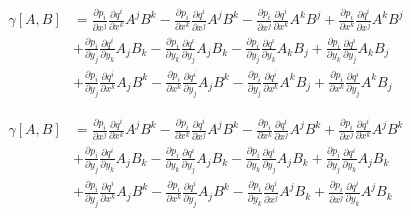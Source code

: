 \documentclass[a4paper,10pt]{article}
\numberwithin{equation}{section}
\begin{document}
\begin{align}
 \gamma[A,B] &= \frac{\partial p_i}{\partial x^j}\frac{\partial q^i}{\partial x^k}A^jB^k 
 - \frac{\partial p_i}{\partial x^k}\frac{\partial q^i}{\partial x^j}A^jB^k
 - \frac{\partial p_i}{\partial x^j}\frac{\partial q^i}{\partial x^k}A^kB^j 
 + \frac{\partial p_i}{\partial x^k}\frac{\partial q^i}{\partial x^j}A^kB^j\\
 &+ \frac{\partial p_i}{\partial y_j}\frac{\partial q^i}{\partial y_k}A_jB_k 
 - \frac{\partial p_i}{\partial y_k}\frac{\partial q^i}{\partial y_j}A_jB_k
 - \frac{\partial p_i}{\partial y_j}\frac{\partial q^i}{\partial y_k}A_kB_j 
 + \frac{\partial p_i}{\partial y_k}\frac{\partial q^i}{\partial y_j}A_kB_j\\
 &+  \frac{\partial p_i}{\partial y_j}\frac{\partial q^i}{\partial x^k}A_jB^k
 - \frac{\partial p_i}{\partial x^k}\frac{\partial q^i}{\partial y_j}A_jB^k
 -\frac{\partial p_i}{\partial y_j}\frac{\partial q^i}{\partial x^k}A^kB_j 
 + \frac{\partial p_i}{\partial x^k}\frac{\partial q^i}{\partial y_j}A^kB_j
\end{align}

\begin{align}
 \gamma[A,B] &= \frac{\partial p_i}{\partial x^j}\frac{\partial q^i}{\partial x^k}A^jB^k 
 - \frac{\partial p_i}{\partial x^k}\frac{\partial q^i}{\partial x^j}A^jB^k
 - \frac{\partial p_i}{\partial x^k}\frac{\partial q^i}{\partial x^j}A^jB^k 
 + \frac{\partial p_i}{\partial x^j}\frac{\partial q^i}{\partial x^k}A^jB^k\\
 &+ \frac{\partial p_i}{\partial y_j}\frac{\partial q^i}{\partial y_k}A_jB_k 
 - \frac{\partial p_i}{\partial y_k}\frac{\partial q^i}{\partial y_j}A_jB_k
 - \frac{\partial p_i}{\partial y_k}\frac{\partial q^i}{\partial y_j}A_jB_k 
 + \frac{\partial p_i}{\partial y_j}\frac{\partial q^i}{\partial y_k}A_jB_k\\
 &+  \frac{\partial p_i}{\partial y_j}\frac{\partial q^i}{\partial x^k}A_jB^k
 - \frac{\partial p_i}{\partial x^k}\frac{\partial q^i}{\partial y_j}A_jB^k
 -\frac{\partial p_i}{\partial y_k}\frac{\partial q^i}{\partial x^j}A^jB_k 
 + \frac{\partial p_i}{\partial x^j}\frac{\partial q^i}{\partial y_k}A^jB_k
\end{align}
\end{document}
